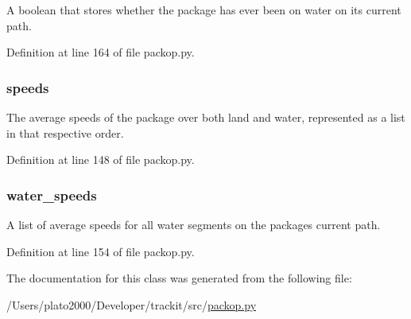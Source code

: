 A boolean that stores whether the package has ever been on water on its current path. 



Definition at line 164 of file packop.\+py.

\subsubsection[{\texorpdfstring{speeds}{speeds}}]{\setlength{\rightskip}{0pt plus 5cm}speeds}\hypertarget{classsrc_1_1packop_1_1_package_ad51ff69ce00ee5c869723c572db0eefd}{}\label{classsrc_1_1packop_1_1_package_ad51ff69ce00ee5c869723c572db0eefd}


The average speeds of the package over both land and water, represented as a list in that respective order. 



Definition at line 148 of file packop.\+py.

\subsubsection[{\texorpdfstring{water\+\_\+speeds}{water_speeds}}]{\setlength{\rightskip}{0pt plus 5cm}water\+\_\+speeds}\hypertarget{classsrc_1_1packop_1_1_package_a4fd9fe5f73cb34aa5b5c7029f024d4f6}{}\label{classsrc_1_1packop_1_1_package_a4fd9fe5f73cb34aa5b5c7029f024d4f6}


A list of average speeds for all water segments on the package\textquotesingle{}s current path. 



Definition at line 154 of file packop.\+py.



The documentation for this class was generated from the following file\+:\begin{DoxyCompactItemize}
\item 
/\+Users/plato2000/\+Developer/trackit/src/\hyperlink{packop_8py}{packop.\+py}\end{DoxyCompactItemize}
